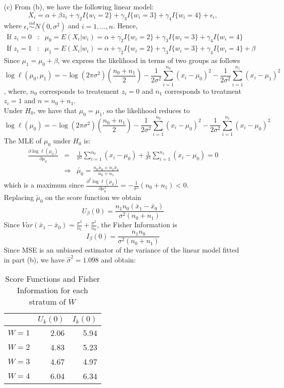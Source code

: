 \documentclass[11pt,a4paper]{article}
\begin{document}
\begin{itemize}
\item[(c)]
From (b), we have the following linear model: 
$$X_i=\alpha+\beta z_i+\gamma_2 I\{w_i=2\}+\gamma_3 I\{w_i=3\}+\gamma_4 I\{w_i=4\}+\epsilon_i,$$
where $\epsilon_i\stackrel{iid}{\sim}N(0,\sigma^2)$ and $i=1,\ldots,n$.
Hence,
\begin{eqnarray*}
\text{If }z_i=0&:& \mu_0=E(X_i|w_i)=\alpha+\gamma_2 I\{w_i=2\}+\gamma_3 I\{w_i=3\}+\gamma_4 I\{w_i=4\}\\
\text{If }z_i=1&:& \mu_1=E(X_i|w_i)=\alpha+\gamma_2 I\{w_i=2\}+\gamma_3 I\{w_i=3\}+\gamma_4 I\{w_i=4\}+\beta
\end{eqnarray*}
Since $\mu_1=\mu_0+\beta$, we express the likelihood in terms of two groups as follows
$$\log \ell(\mu_0,\mu_1)=-\log(2\pi\sigma^2)\left(\frac{n_0+n_1}{2}\right)
-\frac{1}{2\sigma^2}\sum_{i=1}^{n_0}(x_i-\mu_0)^2-\frac{1}{2\sigma^2}\sum_{i=1}^{n_1}(x_i-\mu_1)^2$$, 
where, $n_0$ corresponds to treatement $z_i=0$ and $n_1$ corresponds to treatment $z_i=1$ and $n=n_0+n_1$. \\
Under $H_0$, we have that $\mu_0=\mu_1$, so the likelihood reduces to 
$$\log \ell(\mu_0)=-\log(2\pi\sigma^2)\left(\frac{n_0+n_1}{2}\right)
-\frac{1}{2\sigma^2}\sum_{i=1}^{n_0}(x_i-\mu_0)^2-\frac{1}{2\sigma^2}\sum_{i=1}^{n_1}(x_i-\mu_0)^2$$
The MLE of $\mu_0$ under $H_0$ is:
\begin{eqnarray*}
 \frac{\partial \log \ell(\mu_0)}{\partial \mu_0}&=& \frac{1}{\sigma^2}\sum_{i=1}^{n_0}(x_i-\mu_0)+\frac{1}{\sigma^2}\sum_{i=1}^{n_1}(x_i-\mu_0)=0\\
&\Rightarrow& \tilde{\mu_0}=\frac{n_0\bar{x}_0+n_1\bar{x}_1}{n_0+n_1}
\end{eqnarray*}
which is a maximum since $ \frac{\partial^2 \log \ell(\mu_0)}{\partial \mu_0^2} = -\frac{1}{\sigma^2}(n_0+n_1)<0$.\\
Replacing $\tilde{\mu}_0$ on the score function we obtain $$U_\beta(0)=\dfrac{n_1n_0(\bar{x}_1-\bar{x}_0)}{\sigma^2(n_0+n_1)}$$
Since $Var(\bar{x}_1-\bar{x}_0)=\frac{\sigma^2}{n_1}+\frac{\sigma^2}{n_0}$, the Fisher Information is 
$$I_\beta(0)=\dfrac{n_1n_0}{\sigma^2(n_0+n_1)}$$ 
Since MSE is an unbiased estimator of the variance of the linear model fitted in part (b), we have $\hat{\sigma}^2=1.098$ and obtain:
\begin{table}[H]
\centering
\begin{tabular}{rrr}
  \hline
 & $U_k(0)$ & $I_k(0)$ \\ 
  \hline
$W=1$ & 2.06 & 5.94 \\ 
$W=2$ & 4.83 & 5.23 \\ 
$W=3$ & 4.67 & 4.97 \\ 
$W=4$ & 6.04 & 6.34 \\ 
   \hline
\end{tabular}
\caption{Score Functions and Fisher Information for each stratum of $W$}
\end{table}


\end{itemize}
\end{document}
